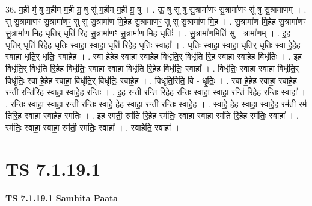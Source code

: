 \documentclass[17pt]{extarticle}
\begin{document}
36. म॒ही मु॑ वु म॒हीम् म॒ही मू॒ षु सू॑ म॒हीम् म॒ही मू॒ षु । . ऊ॒ षु सू॑ षु सु॒त्रामा॑णꣳ सु॒त्रामा॑णꣳ॒॒ सू॑ षु सु॒त्रामा॑णम् । . सु सु॒त्रामा॑णꣳ सु॒त्रामा॑णꣳ॒॒ सु सु सु॒त्रामा॑ण मि॒हेह सु॒त्रामा॑णꣳ॒॒ सु सु सु॒त्रामा॑ण मि॒ह । . सु॒त्रामा॑ण मि॒हेह सु॒त्रामा॑णꣳ सु॒त्रामा॑ण मि॒ह धृति॒र् धृति॑ रि॒ह सु॒त्रामा॑णꣳ सु॒त्रामा॑ण मि॒ह धृतिः॑ । . सु॒त्रामा॑ण॒मिति॑ सु - त्रामा॑णम् । . इ॒ह धृति॒र् धृति॑ रि॒हेह धृतिः॒ स्वाहा॒ स्वाहा॒ धृति॑ रि॒हेह धृतिः॒ स्वाहा᳚ । . धृतिः॒ स्वाहा॒ स्वाहा॒ धृति॒र् धृतिः॒ स्वा हे॒हेह स्वाहा॒ धृति॒र् धृतिः॒ स्वाहे॒ह । . स्वा हे॒हेह स्वाहा॒ स्वाहे॒ह विधृ॑ति॒र् विधृ॑ति रि॒ह स्वाहा॒ स्वाहे॒ह विधृ॑तिः । . इ॒ह विधृ॑ति॒र् विधृ॑ति रि॒हेह विधृ॑तिः॒ स्वाहा॒ स्वाहा॒ विधृ॑ति रि॒हेह विधृ॑तिः॒ स्वाहा᳚ । . विधृ॑तिः॒ स्वाहा॒ स्वाहा॒ विधृ॑ति॒र् विधृ॑तिः॒ स्वा हे॒हेह स्वाहा॒ विधृ॑ति॒र् विधृ॑तिः॒ स्वाहे॒ह । . विधृ॑ति॒रिति॒ वि - धृ॒तिः॒ । . स्वा हे॒हेह स्वाहा॒ स्वाहे॒ह रन्ती॒ रन्ति॑रि॒ह स्वाहा॒ स्वाहे॒ह रन्तिः॑ । . इ॒ह रन्ती॒ रन्ति॑ रि॒हेह रन्तिः॒ स्वाहा॒ स्वाहा॒ रन्ति॑ रि॒हेह रन्तिः॒ स्वाहा᳚ । . रन्तिः॒ स्वाहा॒ स्वाहा॒ रन्ती॒ रन्तिः॒ स्वाहे॒ हेह स्वाहा॒ रन्ती॒ रन्तिः॒ स्वाहे॒ह । . स्वाहे॒ हेह स्वाहा॒ स्वाहे॒ह रम॑ती॒ रम॑ तिरि॒ह स्वाहा॒ स्वाहे॒ह रम॑तिः । . इ॒ह रम॑ती॒ रम॑ति रि॒हेह रम॑तिः॒ स्वाहा॒ स्वाहा॒ रम॑ति रि॒हेह रम॑तिः॒ स्वाहा᳚ । . रम॑तिः॒ स्वाहा॒ स्वाहा॒ रम॑ती॒ रम॑तिः॒ स्वाहा᳚ । . स्वाहेति॒ स्वाहा᳚ । \newline
\pagebreak
{}

\section{ TS 7.1.19.1 }

\textbf{TS 7.1.19.1 } \newline
\textbf{Samhita Paata} \newline
\end{document}
